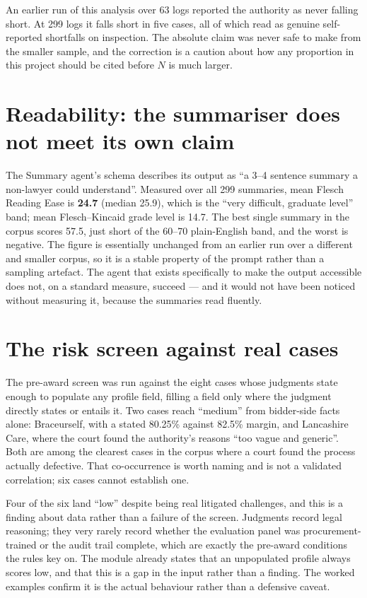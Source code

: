An earlier run of this analysis over 63 logs reported the authority as never
falling short. At 299 logs it falls short in five cases, all of which read as
genuine self-reported shortfalls on inspection. The absolute claim was never safe
to make from the smaller sample, and the correction is a caution about how any
proportion in this project should be cited before $N$ is much larger.

\section{Readability: the summariser does not meet its own claim}
\label{sec:readability}

The Summary agent's schema describes its output as ``a 3--4 sentence summary a
non-lawyer could understand''. Measured over all 299 summaries, mean Flesch
Reading Ease \cite{flesch1948readability} is \textbf{24.7} (median 25.9), which is
the ``very difficult, graduate level'' band; mean Flesch--Kincaid grade level
\cite{kincaid1975derivation} is 14.7. The best single
summary in the corpus scores 57.5, just short of the 60--70 plain-English band, and
the worst is negative. The figure is essentially unchanged from an earlier run over
a different and smaller corpus, so it is a stable property of the prompt rather
than a sampling artefact. The agent that exists specifically to make the output
accessible does not, on a standard measure, succeed --- and it would not have been
noticed without measuring it, because the summaries read fluently.

\section{The risk screen against real cases}
\label{sec:risk-eval}

The pre-award screen was run against the eight cases whose judgments state enough
to populate any profile field, filling a field only where the judgment directly
states or entails it. Two cases reach ``medium'' from bidder-side facts alone:
Braceurself, with a stated 80.25\% against 82.5\% margin, and Lancashire Care,
where the court found the authority's reasons ``too vague and generic''. Both are
among the clearest cases in the corpus where a court found the process actually
defective. That co-occurrence is worth naming and is not a validated correlation;
six cases cannot establish one.

Four of the six land ``low'' despite being real litigated challenges, and this is
a finding about data rather than a failure of the screen. Judgments record legal
reasoning; they very rarely record whether the evaluation panel was procurement-
trained or the audit trail complete, which are exactly the pre-award conditions the
rules key on. The module already states that an unpopulated profile always scores
low, and that this is a gap in the input rather than a finding. The worked
examples confirm it is the actual behaviour rather than a defensive caveat.

